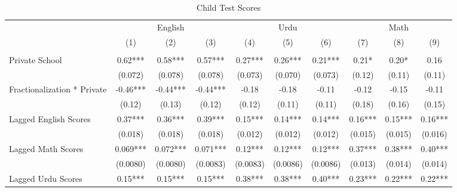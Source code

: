 \begin{sidewaystable}[htbp]\centering
\def\sym#1{\ifmmode^{#1}\else\(^{#1}\)\fi}
\caption{Child Test Scores\label{kids}}
\begin{tabular}{l*{9}{c}}
\toprule
                &\multicolumn{3}{c}{English}           &\multicolumn{3}{c}{Urdu}              &\multicolumn{3}{c}{Math}              \\\cmidrule(lr){2-4}\cmidrule(lr){5-7}\cmidrule(lr){8-10}
                &\multicolumn{1}{c}{(1)}&\multicolumn{1}{c}{(2)}&\multicolumn{1}{c}{(3)}&\multicolumn{1}{c}{(4)}&\multicolumn{1}{c}{(5)}&\multicolumn{1}{c}{(6)}&\multicolumn{1}{c}{(7)}&\multicolumn{1}{c}{(8)}&\multicolumn{1}{c}{(9)}\\
                &\multicolumn{1}{c}{}&\multicolumn{1}{c}{}&\multicolumn{1}{c}{}&\multicolumn{1}{c}{}&\multicolumn{1}{c}{}&\multicolumn{1}{c}{}&\multicolumn{1}{c}{}&\multicolumn{1}{c}{}&\multicolumn{1}{c}{}\\
\midrule
Private School  &     0.62***&     0.58***&     0.57***&     0.27***&     0.26***&     0.21***&     0.21*  &     0.20*  &     0.16   \\
                &  (0.072)   &  (0.078)   &  (0.078)   &  (0.073)   &  (0.070)   &  (0.073)   &   (0.12)   &   (0.11)   &   (0.11)   \\
Fractionalization * Private&    -0.46***&    -0.44***&    -0.44***&    -0.18   &    -0.18   &    -0.11   &    -0.12   &    -0.15   &    -0.11   \\
                &   (0.12)   &   (0.13)   &   (0.12)   &   (0.12)   &   (0.11)   &   (0.11)   &   (0.18)   &   (0.16)   &   (0.15)   \\
Lagged English Scores&     0.37***&     0.36***&     0.39***&     0.15***&     0.14***&     0.14***&     0.16***&     0.15***&     0.16***\\
                &  (0.018)   &  (0.018)   &  (0.018)   &  (0.012)   &  (0.012)   &  (0.012)   &  (0.015)   &  (0.015)   &  (0.016)   \\
Lagged Math Scores&    0.069***&    0.072***&    0.071***&     0.12***&     0.12***&     0.12***&     0.37***&     0.38***&     0.40***\\
                & (0.0080)   & (0.0080)   & (0.0083)   & (0.0083)   & (0.0086)   & (0.0086)   &  (0.013)   &  (0.014)   &  (0.014)   \\
Lagged Urdu Scores&     0.15***&     0.15***&     0.15***&     0.38***&     0.38***&     0.40***&     0.23***&     0.22***&     0.22***\\

\end{tabular}
\end{sidewaystable}
